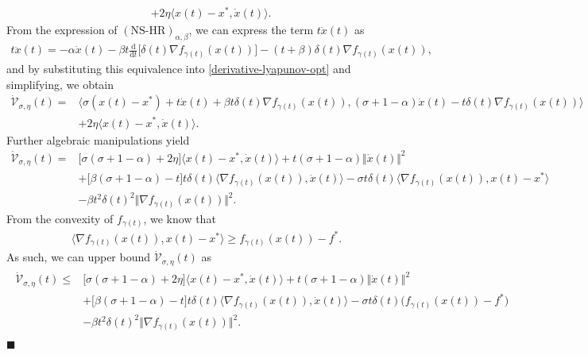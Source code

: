 \documentclass[11pt]{article}
\numberwithin{equation}{section}
\newenvironment{proof}{\bigskip\noindent{\bf Proof.}}{\hfill $\blacksquare$ \par\bigskip\noindent}
\begin{document}
\begin{proof}
\begin{align}
    &+2\eta\langle x(t)-x^*,\dot{x}(t) \rangle. 
\end{align}
From the expression of $(\text{NS-HR})_{\alpha,\beta}$, we can express the term $t \ddot{x}(t)$ as
\begin{align*}
    t\ddot{x}(t)=-\alpha\dot{x}(t)-\beta t\frac{\mathrm{d}}{\mathrm{d}t}\Big[\delta(t)\nabla f_{\gamma(t)}(x(t))\Big]-(t+\beta)\delta(t)\nabla f_{\gamma(t)}(x(t)),
\end{align*}
and by substituting this equivalence into \eqref{derivative-lyapunov-opt} and simplifying, we obtain
\begin{align*}
\dot{\mathcal{V}}_{\sigma,\eta}(t)=&\Big \langle \sigma(x(t)-x^*)+t\dot{x}(t)+\beta t\delta(t)\nabla f_{\gamma(t)}(x(t)), (\sigma+1-\alpha)\dot{x}(t)-t\delta(t)\nabla f_{\gamma(t)}(x(t)) \Big\rangle \\
    &+2\eta\langle x(t)-x^*,\dot{x}(t) \rangle. 
\end{align*}
Further algebraic manipulations yield 
\begin{align*}
\dot{\mathcal{V}}_{\sigma,\eta}(t)=&\Big[\sigma(\sigma+1-\alpha)+2\eta\Big]\langle x(t)-x^*,\dot{x}(t) \rangle +t(\sigma+1-\alpha)\Vert \dot{x}(t) \Vert^2 \\
    &+\Big[\beta(\sigma+1-\alpha)-t\Big]t\delta(t)\Big\langle \nabla f_{\gamma(t)}(x(t)),\dot{x}(t) \Big\rangle -\sigma t\delta(t) \Big \langle\nabla f_{\gamma(t)}(x(t)),x(t)-x^{*} \Big \rangle \\
    &-\beta t^2\delta(t)^2\Big\Vert \nabla f_{\gamma(t)}(x(t)) \Big \Vert^2.
\end{align*}
From the convexity of $f_{\gamma(t)}$, we know that
\begin{align*}
\Big \langle\nabla f_{\gamma(t)}(x(t)),x(t)-x^{*} \Big \rangle \geq f_{\gamma(t)}(x(t))-f^*. 
\end{align*}
As such, we can upper bound $\dot{\mathcal{V}}_{\sigma,\eta}(t)$ as 
\begin{align}
    \label{derivative-lyapunov-second-compo}
    \begin{split}
     \dot{\mathcal{V}}_{\sigma,\eta}(t) \le& \Big[\sigma(\sigma+1-\alpha)+2\eta\Big]\langle x(t)-x^*,\dot{x}(t) \rangle +t(\sigma+1-\alpha)\Vert \dot{x}(t) \Vert^2 \\
    &+\Big[\beta(\sigma+1-\alpha)-t\Big]t\delta(t)\Big\langle \nabla f_{\gamma(t)}(x(t)),\dot{x}(t) \Big\rangle  -\sigma t\delta(t) \Big(f_{\gamma(t)}(x(t))-f^*\Big) \\
    &-\beta t^2\delta(t)^2\Big\Vert \nabla f_{\gamma(t)}(x(t)) \Big \Vert^2.   

\end{split}
\end{align}
\end{proof}
\end{document}
